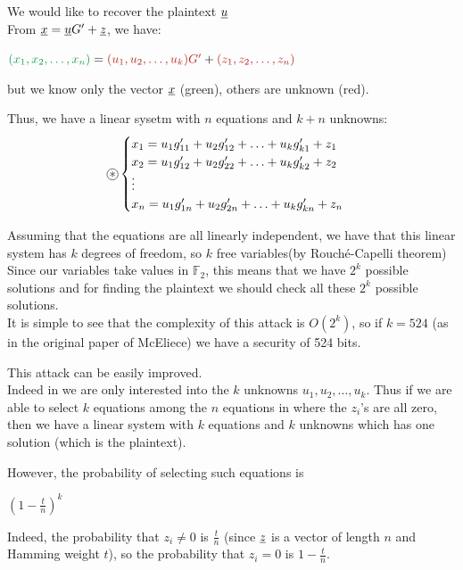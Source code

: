 \noindent
We would like to recover the plaintext $\underline{u}$\\
From $\underline{x} = \underline{u}G' + \underline{z}$, we have:
\begin{center}
    $\textcolor{ForestGreen}{(x_1, x_2, \ldots, x_n)} = \textcolor{BrickRed}{(u_1, u_2, \ldots, u_k)G'} + \textcolor{BrickRed}{(z_1, z_2, \ldots, z_n)}$
\end{center}
\noindent
but we know only the vector $\underline{x}$ (green), others are unknown (red).\medskip

\noindent
Thus, we have a linear sysetm with $n$ equations and $k + n$ unknowns:
\[\circleast\begin{cases}
    x_1 = u_1g'_{11} + u_2g'_{12} + \ldots + u_k g'_{k1} + z_1 \\
    x_2 = u_1g'_{12} + u_2g'_{22} + \ldots + u_k g'_{k2} + z_2 \\
    \vdots \\
    x_n = u_1g'_{1n} + u_2g'_{2n} + \ldots + u_k g'_{kn} + z_n
\end{cases}\]

\noindent
Assuming that the equations are all linearly independent, we have that this linear system has $k$ degrees of freedom, so $k$ free variables(by Rouché-Capelli theorem)\\
Since our variables take values in $\mathbb{F}_2$, this means that we have $2^k$ possible solutions and for finding the plaintext we should check all these $2^k$ possible solutions.\\
It is simple to see that the complexity of this attack is $O(2^k)$, so if $k = 524$ (as in the original paper of McEliece) we have a security of 524 bits.
\vspace{1 cm}

\noindent
This attack can be easily improved.\\
Indeed in \circleast  we are only interested into the $k$ unknowns $u_1, u_2, \ldots, u_k$. Thus if we are able to select $k$ equations among the $n$ equations in \circleast  where the $z_i$'s are all zero, then we have a linear system with $k$ equations and $k$ unknowns which has one solution (which is the plaintext).
\medskip

\noindent
However, the probability of selecting such equations is
\begin{center}
    $(1 -\frac{t}{n})^k$
\end{center}
\noindent
Indeed, the probability that $z_i \neq 0$ is $\frac{t}{n}$ (since $\underline{z}$ is a vector of length $n$ and Hamming weight $t$), so the probability that $z_i = 0$ is $1 - \frac{t}{n}$.
\vspace{1 cm}

